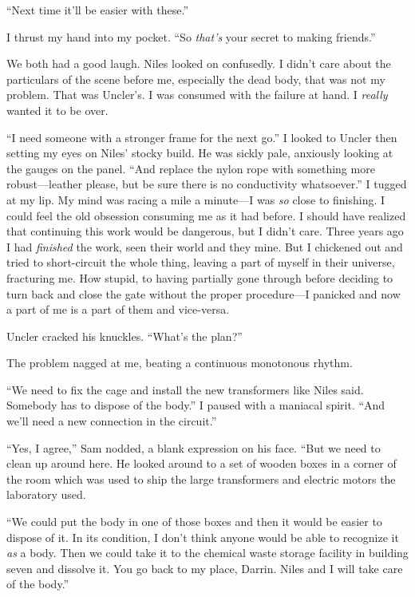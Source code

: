 \documentclass[
]{article}
\begin{document}
``Next time it'll be easier with these.''

I thrust my hand into my pocket. ``So \emph{that's} your secret to
making friends.''

We both had a good laugh. Niles looked on confusedly. I didn't care
about the particulars of the scene before me, especially the dead body,
that was not my problem. That was Uncler's. I was consumed with the
failure at hand. I \emph{really} wanted it to be over.

``I need someone with a stronger frame for the next go.'' I looked to
Uncler then setting my eyes on Niles' stocky build. He was sickly pale,
anxiously looking at the gauges on the panel. ``And replace the nylon
rope with something more robust---leather please, but be sure there is
no conductivity whatsoever.'' I tugged at my lip. My mind was racing a
mile a minute---I was \emph{so} close to finishing. I could feel the old
obsession consuming me as it had before. I should have realized that
continuing this work would be dangerous, but I didn't care. Three years
ago I had \emph{finished} the work, seen their world and they mine. But
I chickened out and tried to short-circuit the whole thing, leaving a
part of myself in their universe, fracturing me. How stupid, to having
partially gone through before deciding to turn back and close the gate
without the proper procedure---I panicked and now a part of me is a part
of them and vice-versa.

Uncler cracked his knuckles. ``What's the plan?''

The problem nagged at me, beating a continuous monotonous rhythm.

``We need to fix the cage and install the new transformers like Niles
said. Somebody has to dispose of the body.'' I paused with a maniacal
spirit. ``And we'll need a new connection in the circuit.''

``Yes, I agree,'' Sam nodded, a blank expression on his face. ``But we
need to clean up around here. He looked around to a set of wooden boxes
in a corner of the room which was used to ship the large transformers
and electric motors the laboratory used.

``We could put the body in one of those boxes and then it would be
easier to dispose of it. In its condition, I don't think anyone would be
able to recognize it \emph{as} a body. Then we could take it to the
chemical waste storage facility in building seven and dissolve it. You
go back to my place, Darrin. Niles and I will take care of the body.''
\end{document}
